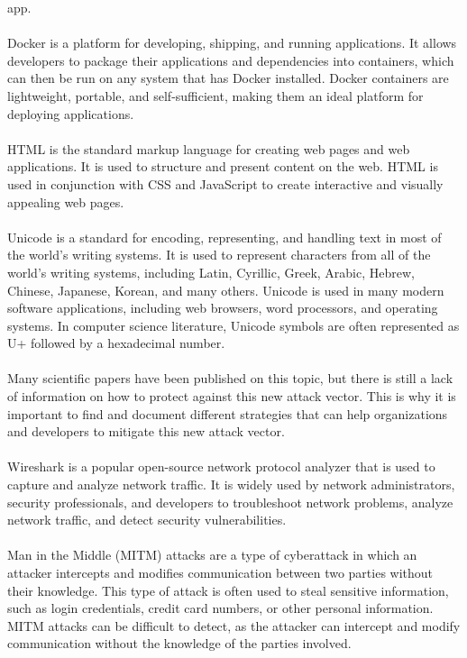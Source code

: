 \documentclass[12pt]{report}
\begin{document}
app. \\ \\
Docker is a platform for developing, shipping, and running applications. It allows
developers to package their applications and dependencies into containers, which
can then be run on any system that has Docker installed. Docker containers are
lightweight, portable, and self-sufficient, making them an ideal platform for
deploying applications. \\ \\
HTML is the standard markup language for creating web pages and web applications.
It is used to structure and present content on the web. HTML is used in conjunction
with CSS and JavaScript to create interactive and visually appealing web pages.
\\ \\
Unicode is a standard for encoding, representing, and handling text in most of the
world's writing systems. It is used to represent characters from all of the world's
writing systems, including Latin, Cyrillic, Greek, Arabic, Hebrew, Chinese, Japanese,
Korean, and many others. Unicode is used in many modern software applications,
including web browsers, word processors, and operating systems. In computer science
literature, Unicode symbols are often represented as U+ followed by a hexadecimal number. \\ \\
Many scientific papers have been published on this topic, but there is still a
lack of information on how to protect against this new attack vector. This is why
it is important to find and document different strategies that can help organizations
and developers to mitigate this new attack vector. \\ \\
Wireshark is a popular open-source network protocol analyzer that is used to capture and
analyze network traffic. It is widely used by network administrators, security
professionals, and developers to troubleshoot network problems, analyze network
traffic, and detect security vulnerabilities. \\ \\
Man in the Middle (MITM) attacks are a type of cyberattack in which an attacker intercepts
and modifies communication between two parties without their knowledge. This type
of attack is often used to steal sensitive information, such as login credentials,
credit card numbers, or other personal information. MITM attacks can be difficult
to detect, as the attacker can intercept and modify communication without the
knowledge of the parties involved. \\ \\
\end{document}
